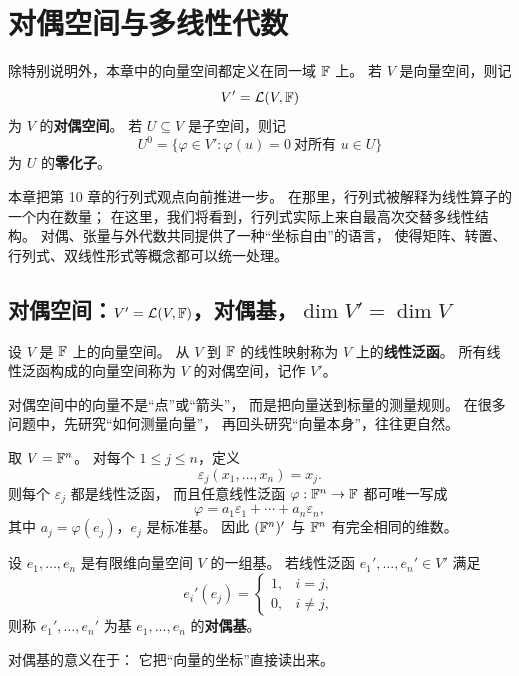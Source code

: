 \chapter{对偶空间与多线性代数}




\begin{notation} 除特别说明外，本章中的向量空间都定义在同一域 $\mathbb{F}$ 上。 若 $V$ 是向量空间，则记 \[ V'=\mathcal{L}(V,\mathbb{F}) \] 为 $V$ 的\textbf{对偶空间}。 若 $U\subseteq V$ 是子空间，则记 \[ U^0=\{\varphi\in V' : \varphi(u)=0\ \text{对所有 }u\in U\} \] 为 $U$ 的\textbf{零化子}。 \end{notation} 本章把第 10 章的行列式观点向前推进一步。 在那里，行列式被解释为线性算子的一个内在数量； 在这里，我们将看到，行列式实际上来自最高次交替多线性结构。 对偶、张量与外代数共同提供了一种“坐标自由”的语言， 使得矩阵、转置、行列式、双线性形式等概念都可以统一处理。




\section{对偶空间：$V'=\mathcal{L}(V,\mathbb{F})$，对偶基，$\dim V'=\dim V$}




\begin{definition} 设 $V$ 是 $\mathbb{F}$ 上的向量空间。 从 $V$ 到 $\mathbb{F}$ 的线性映射称为 $V$ 上的\textbf{线性泛函}。 所有线性泛函构成的向量空间称为 $V$ 的对偶空间，记作 $V'$。 \end{definition} 对偶空间中的向量不是“点”或“箭头”， 而是把向量送到标量的测量规则。 在很多问题中，先研究“如何测量向量”， 再回头研究“向量本身”，往往更自然。




\begin{example} 取 $V=\mathbb{F}^n$。 对每个 $1\leq j\leq n$，定义 \[ \varepsilon_j(x_1,\dots,x_n)=x_j. \] 则每个 $\varepsilon_j$ 都是线性泛函， 而且任意线性泛函 $\varphi:\mathbb{F}^n\to\mathbb{F}$ 都可唯一写成 \[ \varphi=a_1\varepsilon_1+\cdots+a_n\varepsilon_n, \] 其中 $a_j=\varphi(e_j)$，$e_j$ 是标准基。 因此 $(\mathbb{F}^n)'$ 与 $\mathbb{F}^n$ 有完全相同的维数。 \end{example}




\begin{definition} 设 $e_1,\dots,e_n$ 是有限维向量空间 $V$ 的一组基。 若线性泛函 $e_1',\dots,e_n'\in V'$ 满足 \[ e_i'(e_j)= \begin{cases} 1,& i=j,\\ 0,& i\neq j, \end{cases} \] 则称 $e_1',\dots,e_n'$ 为基 $e_1,\dots,e_n$ 的\textbf{对偶基}。 \end{definition} 对偶基的意义在于： 它把“向量的坐标”直接读出来。




